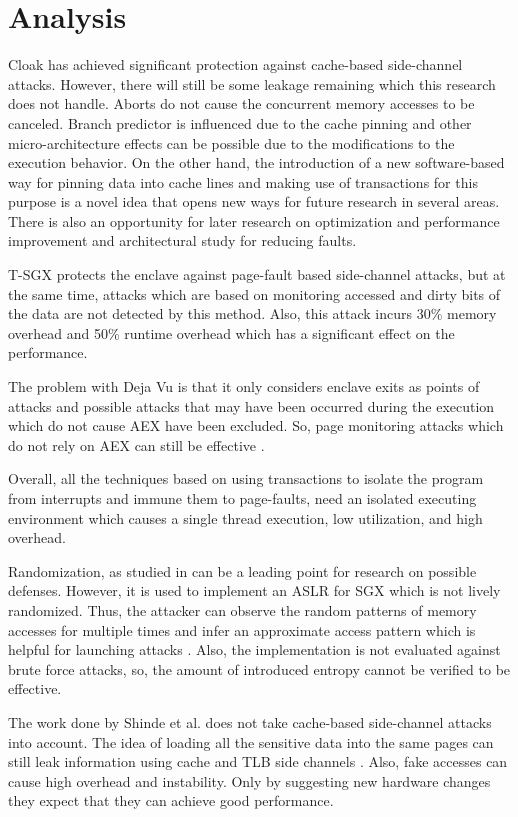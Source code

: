 \section{Analysis}
Cloak \cite{cloak} has achieved significant protection against cache-based side-channel attacks. However, there will still be some leakage remaining which this research does not handle. Aborts do not cause the concurrent memory accesses to be canceled. Branch predictor is influenced due to the cache pinning and other micro-architecture effects can be possible due to the modifications to the execution behavior. On the other hand, the introduction of a new software-based way for pinning data into cache lines and making use of transactions for this purpose is a novel idea that opens new ways for future research in several areas. There is also an opportunity for later research on optimization and performance improvement and architectural study for reducing faults.

T-SGX \cite{tsgx} protects the enclave against page-fault based side-channel attacks, but at the same time, attacks which are based on monitoring accessed and dirty bits of the data are not detected by this method. Also, this attack incurs 30\% memory overhead and 50\% runtime overhead which has a significant effect on the performance.

The problem with Deja Vu \cite{dejavu} is that it only considers enclave exits as points of attacks and possible attacks that may have been occurred during the execution which do not cause AEX have been excluded. So, page monitoring attacks which do not rely on AEX can still be effective \cite{leakycauldron}.

Overall, all the techniques based on using transactions to isolate the program from interrupts and immune them to page-faults, need an isolated executing environment which causes a single thread execution, low utilization, and high overhead.

Randomization, as studied in \cite{sgxshield} can be a leading point for research on possible defenses. However, it is used to implement an ASLR for SGX which is not lively randomized. Thus, the attacker can observe the random patterns of memory accesses for multiple times and infer an approximate access pattern which is helpful for launching attacks \cite{leakycauldron}. Also, the implementation is not evaluated against brute force attacks, so, the amount of introduced entropy cannot be verified to be effective.

The work done by Shinde et al. \cite{pigeonhole} does not take cache-based side-channel attacks into account. The idea of loading all the sensitive data into the same pages can still leak information using cache and TLB side channels \cite{leakycauldron}. Also, fake accesses can cause high overhead and instability. Only by suggesting new hardware changes they expect that they can achieve good performance.

